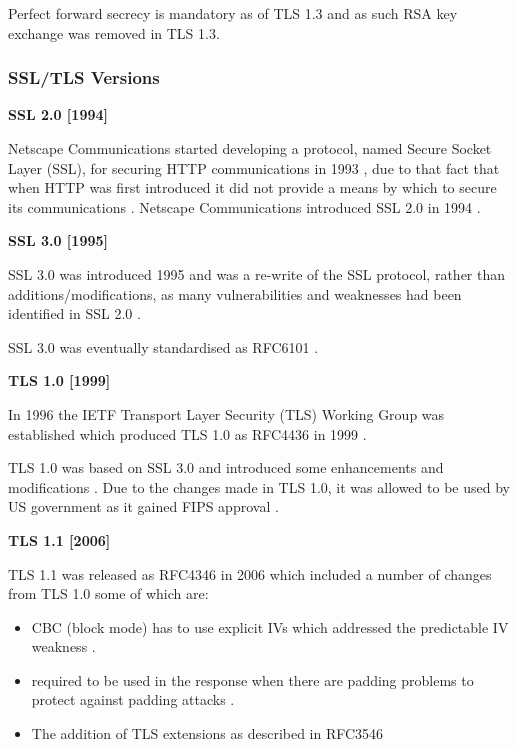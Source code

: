 \documentclass{mscreport}
\begin{document}
\vspace{0.3cm} \noindent
Perfect forward secrecy is mandatory as of TLS 1.3 and as such RSA key exchange was removed in TLS 1.3.

\subsubsection{SSL/TLS Versions}
\textbf{SSL 2.0 [1994]}

\noindent
Netscape Communications started developing a protocol, named Secure Socket Layer (SSL), for securing HTTP communications in 1993 \cite{Oppliger2016-ig}, due to that fact that when HTTP was first introduced it did not provide a means by which to secure its communications \cite{Oppliger2016-ig}.
Netscape Communications introduced SSL 2.0 in 1994 \cite{Oppliger2016-ig,Wu2016-nx}.

\vspace{0.7cm} \noindent
\textbf{SSL 3.0 [1995]}

\noindent
SSL 3.0 was introduced 1995 \cite{Ristic2017-aj,Oppliger2016-ig} and was a re-write of the SSL protocol, rather than additions/modifications, as many vulnerabilities and weaknesses had been identified in SSL 2.0 \cite{Ristic2017-aj,Wagner1996-fx}.

\vspace{0.3cm}\noindent
SSL 3.0 was eventually standardised as RFC6101 \cite{Freier2011-pt}.

\vspace{0.7cm} \noindent
\textbf{TLS 1.0 [1999]}

\noindent
In 1996 the IETF Transport Layer Security (TLS) Working Group was established \cite{Oppliger2016-ig,Farrell2010-kv} which produced TLS 1.0 as RFC4436 in 1999 \cite{Dierks1999-fn}.

\vspace{0.3cm} \noindent
TLS 1.0 was based on SSL 3.0 and introduced some enhancements and modifications \cite{Rescorla2001-gg}. Due to the changes made in TLS 1.0, it was allowed to be used by US government as it gained FIPS approval \cite{Ristic2017-aj}.

\vspace{0.7cm} \noindent
\textbf{TLS 1.1 [2006]}

\noindent
TLS 1.1 was released as RFC4346 in 2006 \cite{Dierks2006-wu} which included a number of changes from TLS 1.0 some of which are:
\begin{itemize}
  \setlength\itemsep{0.1em}
  \item CBC (block mode) has to use explicit IVs which addressed the predictable IV weakness \cite{Ristic2017-aj}.
  \item \texttt{} required to be used in the response when there are padding problems to protect against padding attacks \cite{Ristic2017-aj}.
  \item The addition of TLS extensions \cite{Ristic2017-aj} as described in RFC3546 \cite{Blake-Wilson2003-qv}
\end{itemize}
\end{document}
